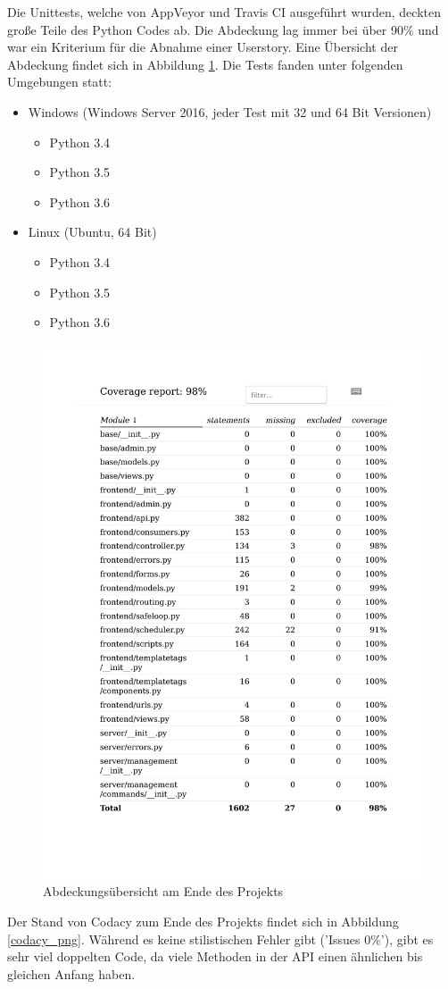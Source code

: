 Die Unittests, welche von AppVeyor und Travis CI ausgeführt wurden, deckten große Teile des Python Codes ab.
Die Abdeckung lag immer bei über 90\% und war ein Kriterium für die Abnahme einer Userstory. Eine Übersicht der Abdeckung
findet sich in Abbildung \ref{coverage_pdf}.
Die Tests fanden unter folgenden Umgebungen statt:
\begin{itemize}
	\item Windows (Windows Server 2016, jeder Test mit 32 und 64 Bit Versionen)
		\begin{itemize}
			\item Python 3.4
			\item Python 3.5
			\item Python 3.6
		\end{itemize}
	\item Linux (Ubuntu, 64 Bit)
		\begin{itemize}
			\item Python 3.4
			\item Python 3.5
			\item Python 3.6
		\end{itemize}
\end{itemize}
\begin{figure}[t]
	\centering
\includegraphics[width=.8\textwidth]{img/coverage.pdf}
	\caption{Abdeckungsübersicht am Ende des Projekts}
	\label{coverage_pdf}
\end{figure}
Der Stand von Codacy zum Ende des Projekts findet sich in Abbildung \ref{codacy_png}. Während
es keine stilistischen Fehler gibt ('Issues 0\%'), gibt es sehr viel doppelten Code, da viele Methoden
in der API einen ähnlichen bis gleichen Anfang haben.

